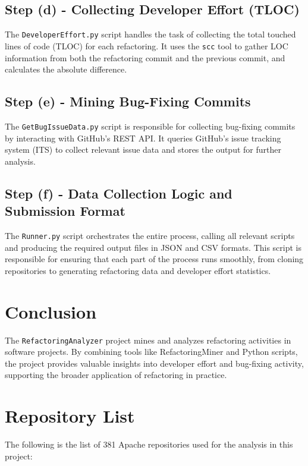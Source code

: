 \documentclass[sigconf]{acmart}
\begin{document}
\subsection{Step (d) - Collecting Developer Effort (TLOC)}
The \texttt{DeveloperEffort.py} script handles the task of collecting the total touched lines of code (TLOC) for each refactoring. It uses the \texttt{scc} tool to gather LOC information from both the refactoring commit and the previous commit, and calculates the absolute difference.

\subsection{Step (e) - Mining Bug-Fixing Commits}
The \texttt{GetBugIssueData.py} script is responsible for collecting bug-fixing commits by interacting with GitHub's REST API. It queries GitHub's issue tracking system (ITS) to collect relevant issue data and stores the output for further analysis.

\subsection{Step (f) - Data Collection Logic and Submission Format}
The \texttt{Runner.py} script orchestrates the entire process, calling all relevant scripts and producing the required output files in JSON and CSV formats. This script is responsible for ensuring that each part of the process runs smoothly, from cloning repositories to generating refactoring data and developer effort statistics.

\section{Conclusion}
The \texttt{RefactoringAnalyzer} project mines and analyzes refactoring activities in software projects. By combining tools like RefactoringMiner and Python scripts, the project provides valuable insights into developer effort and bug-fixing activity, supporting the broader application of refactoring in practice.

\newpage
\appendix
\section{Repository List}
The following is the list of 381 Apache repositories used for the analysis in this project:
\end{document}

